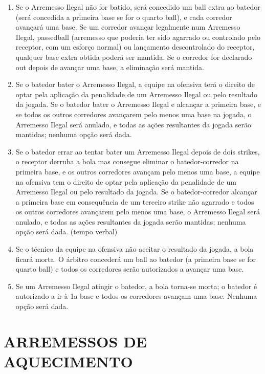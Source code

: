 \begin{enumerate}[label=(\alph*)]
	\item   Se o Arremesso Ilegal não for batido, será concedido um \gls{ball} extra ao batedor (será concedida a primeira base se for o quarto \gls{ball}), e cada corredor  avançará uma base. Se um corredor avançar legalmente num Arremesso Ilegal, \gls{passedball} (arremesso que poderia ter sido agarrado ou controlado pelo receptor, com um esforço normal) ou lançamento descontrolado do receptor, qualquer base extra obtida poderá ser mantida. Se o corredor for declarado \gls{out} depois de avançar uma base, a eliminação será mantida.

	\item  Se o batedor bater o Arremesso Ilegal, a equipe na ofensiva terá o direito de optar pela aplicação da penalidade de um Arremesso Ilegal ou pelo resultado da jogada. Se o batedor bater o Arremesso Ilegal e alcançar a primeira base, e se todos os outros corredores avançarem pelo menos uma base na jogada, o Arremesso Ilegal será anulado, e todas as ações resultantes da jogada serão mantidas; nenhuma opção será dada.

	\item  Se o batedor errar ao tentar bater um Arremesso Ilegal depois de dois \glspl{strike}, o receptor derruba a bola mas consegue eliminar o batedor-corredor na primeira base, e os outros corredores avançam pelo menos uma base, a equipe na ofensiva tem o direito de optar pela aplicação da penalidade de um Arremesso Ilegal ou pelo resultado da jogada. Se o batedor-corredor alcançar a primeira base em consequência de um terceiro \gls{strike} não agarrado e todos os outros corredores avançarem pelo menos uma base, o Arremesso Ilegal será anulado, e todas as ações resultantes da jogada serão mantidas; nenhuma opção será dada. (tempo verbal)

	\item  Se o técnico da equipe na ofensiva não aceitar o resultado da jogada, a bola ficará morta. O árbitro concederá um \gls{ball} ao batedor (a primeira base se for quarto \gls{ball}) e todos os corredores serão autorizados a avançar uma base.

	\item  Se um Arremesso Ilegal atingir o batedor, a bola torna-se morta; o batedor é autorizado a ir à 1a base e todos os corredores avançam uma base. Nenhuma opção será dada.
\end{enumerate}
\section{ARREMESSOS DE AQUECIMENTO}

